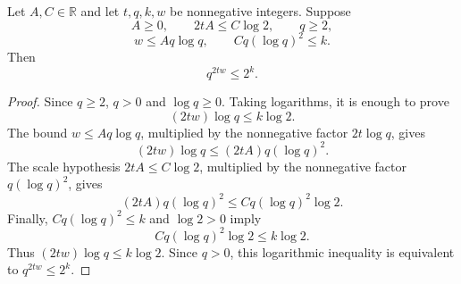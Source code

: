 \begin{helper}
Let \(A,C\in\mathbb R\) and let \(t,q,k,w\) be nonnegative integers.  Suppose
\[
  A\ge0,\qquad 2tA\le C\log2,\qquad q\ge2,
\]
\[
  w\le Aq\log q,
  \qquad
  Cq(\log q)^2\le k.
\]
Then
\[
  q^{2tw}\le2^k.
\]
\end{helper}
\begin{proof}
Since \(q\ge2\), \(q>0\) and \(\log q\ge0\).  Taking logarithms, it is enough
to prove
\[
  (2tw)\log q\le k\log2.
\]
The bound \(w\le Aq\log q\), multiplied by the nonnegative factor
\(2t\log q\), gives
\[
  (2tw)\log q\le (2tA)q(\log q)^2.
\]
The scale hypothesis \(2tA\le C\log2\), multiplied by the nonnegative factor
\(q(\log q)^2\), gives
\[
  (2tA)q(\log q)^2\le Cq(\log q)^2\log2.
\]
Finally, \(Cq(\log q)^2\le k\) and \(\log2>0\) imply
\[
  Cq(\log q)^2\log2\le k\log2.
\]
Thus \((2tw)\log q\le k\log2\).  Since \(q>0\), this logarithmic inequality
is equivalent to \(q^{2tw}\le2^k\).
\end{proof}
